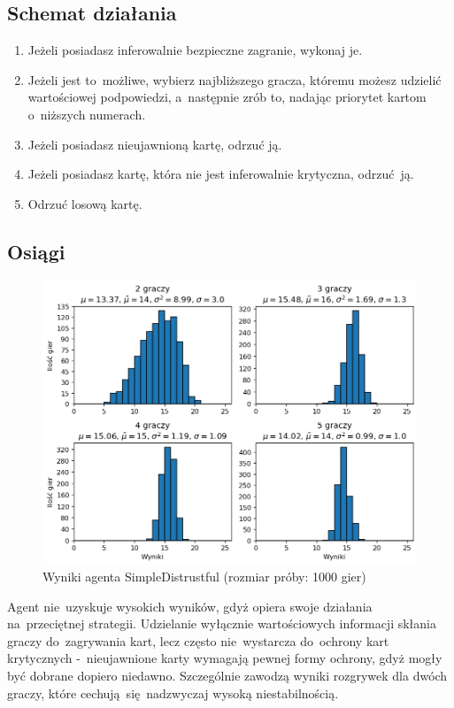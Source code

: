 \documentclass[declaration,shortabstract,inz]{iithesis}
\begin{document}
\subsection*{Schemat działania}

\begin{enumerate}
	\item Jeżeli posiadasz inferowalnie bezpieczne zagranie, wykonaj je.
	\item Jeżeli jest to~możliwe, wybierz najbliższego gracza, któremu możesz udzielić wartościowej podpowiedzi, a~następnie zrób to, nadając priorytet kartom o~niższych numerach.
	\item Jeżeli posiadasz nieujawnioną kartę, odrzuć ją.
	\item Jeżeli posiadasz kartę, która nie jest inferowalnie krytyczna, odrzuć ją.
	\item Odrzuć losową kartę.
\end{enumerate}

\subsection*{Osiągi}

\begin{figure}[H]
	\centering
	\captionsetup{format=hang}
	\includegraphics[width=\textwidth,height=\textheight,keepaspectratio]{SimpleDistrustful.png}
	\caption[Caption]{Wyniki agenta SimpleDistrustful (rozmiar próby: 1000 gier)}
	\label{fig:SimpleDistrustful}
\end{figure}

Agent nie~uzyskuje wysokich wyników, gdyż opiera swoje działania na~przeciętnej strategii. Udzielanie wyłącznie wartościowych informacji skłania graczy do~zagrywania kart, lecz często nie~wystarcza do~ochrony kart krytycznych -~nieujawnione karty wymagają pewnej formy ochrony, gdyż mogły być dobrane dopiero niedawno. Szczególnie zawodzą wyniki rozgrywek dla dwóch graczy, które cechują~się nadzwyczaj wysoką niestabilnością.
\end{document}
